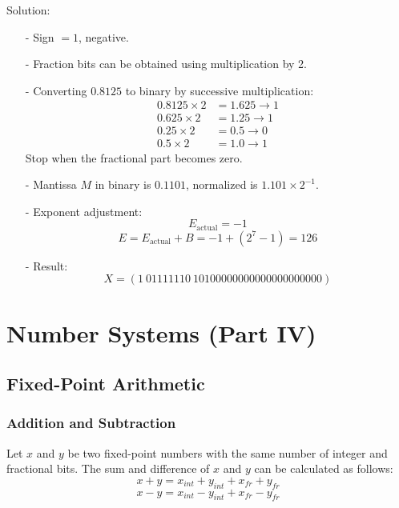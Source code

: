 \documentclass[12pt,openany]{book}
\begin{document}
			      	Solution:
			      	\begin{itemize}
			      		\item[-] Sign \( = 1 \), negative.
			      		\item[-] Fraction bits can be obtained using multiplication by 2.
			      		\item[-] Converting \( 0.8125 \) to binary by successive multiplication:
			      		      \begin{align*}
			      		      	0.8125 \times 2 & = 1.625 \rightarrow 1 \\
			      		      	0.625 \times 2  & = 1.25 \rightarrow 1  \\
			      		      	0.25 \times 2   & = 0.5 \rightarrow 0   \\
			      		      	0.5 \times 2    & = 1.0 \rightarrow 1   
			      		      \end{align*}
			      		      Stop when the fractional part becomes zero.
			      		\item[-] Mantissa \( M \) in binary is \( 0.1101 \), normalized is \( 1.101 \times 2^{-1} \).
			      		\item[-] Exponent adjustment:
			      		      \[ E_{\text{actual}} = -1 \]
			      		      \[ E = E_{\text{actual}} + B = -1 + (2^7 - 1) = 126 \]
			      		\item[-] Result:
			      		      \[ X = (1\ 01111110\ 10100000000000000000000) \]
			      	\end{itemize}
			      	
			      	
			      	\chapter{Number Systems (Part IV)}
			      	\section{Fixed-Point Arithmetic}
			      	\subsection{Addition and Subtraction}
			      	
			      	Let \( x \) and \( y \) be two fixed-point numbers with the same number of integer and fractional bits. The sum and difference of \( x \) and \( y \) can be calculated as follows:
			      	$$x + y = x_{int} + y_{int} + x_{fr} + y_{fr}$$ 
			      	$$x - y = x_{int} - y_{int} + x_{fr} - y_{fr}$$
			      	 
\end{document}

